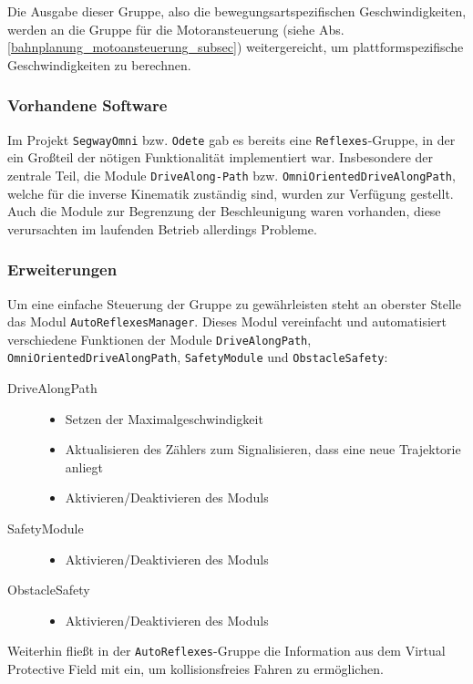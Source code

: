 Die Ausgabe dieser Gruppe, also die bewegungsartspezifischen Geschwindigkeiten, werden an die Gruppe für die Motoransteuerung (siehe Abs. \ref{bahnplanung_motoansteuerung_subsec}) weitergereicht, um plattformspezifische Geschwindigkeiten zu berechnen.

\subsubsection{Vorhandene Software}
\label{bahnplanung_inv_kinem_vorhandene_software_sec}

Im Projekt \lstinline{SegwayOmni} bzw. \lstinline{Odete} gab es bereits eine \lstinline{Reflexes}-Gruppe, in der ein Großteil der nötigen Funktionalität implementiert war.
 Insbesondere der zentrale Teil, die Module
 \lstinline{DriveAlong-}\lstinline{Path} bzw.
 \lstinline{OmniOrientedDriveAlongPath}, welche für die inverse Kinematik zuständig sind, wurden zur Verfügung gestellt.
 Auch die Module zur Begrenzung der Beschleunigung waren vorhanden, diese verursachten im laufenden Betrieb allerdings Probleme.

\subsubsection{Erweiterungen}
\label{bahnplanung_inv_kinem_erweiterung_sec}

Um eine einfache Steuerung der Gruppe zu gewährleisten steht an oberster Stelle das Modul \lstinline{AutoReflexesManager}. Dieses Modul vereinfacht und automatisiert verschiedene Funktionen der Module \lstinline{DriveAlongPath}, \lstinline{OmniOrientedDriveAlongPath}, \lstinline{SafetyModule} und \lstinline{ObstacleSafety}:
\begin{description}
	\item[DriveAlongPath]
	\begin{itemize}
		\item Setzen der Maximalgeschwindigkeit
		\item Aktualisieren des Zählers zum Signalisieren, dass eine neue Trajektorie anliegt
		\item Aktivieren/Deaktivieren des Moduls
	\end{itemize}
	\item[SafetyModule] 
	\begin{itemize}
		\item Aktivieren/Deaktivieren des Moduls
	\end{itemize}
	\item[ObstacleSafety] 
	\begin{itemize}
	\item Aktivieren/Deaktivieren des Moduls	
	\end{itemize}
\end{description}
Weiterhin fließt in der \lstinline{AutoReflexes}-Gruppe die Information aus dem Virtual Protective Field mit ein, um kollisionsfreies Fahren zu ermöglichen.

